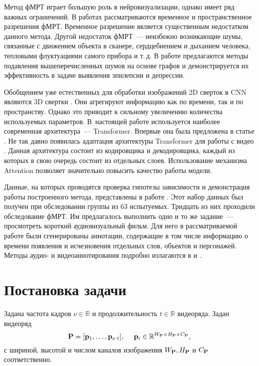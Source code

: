\documentclass[a4paper, 12pt]{article}
\begin{document}
	Метод фМРТ играет большую роль в нейровизуализации, однако имеет ряд важных ограничений.
	В работах \citep{menon1999spatial, logothetis2008we} рассматриваются 
	временное и пространственное разрешения фМРТ. Временное разрешение является существенным
	недостатком данного метода. Другой недостаток фМРТ~--- неизбежно возникающие шумы, 
	связанные с движением объекта в сканере, сердцебиением и дыханием человека, тепловыми
	флуктуациями самого прибора и т.\,д. В работе \citep{1804.10167} предлагаются методы 
	подавления вышеперечисленных шумов на основе графов и демонстрируется их эффективность в задаче
	выявления эпилепсии и депрессии.

	Обобщением уже естественных для обработки изображений 2D сверток в CNN являются 3D
	свертки \citep{Tran_2015_ICCV}.
	Они агрегируют информацию как по времени, так и по пространству.
	Однако это приводит к сильному увеличению количества используемых параметров.
	В~настоящей работе используется наиболее современная архитектура~--- Transformer.
	Впервые она была предложена в статье \citep{https://doi.org/10.48550/arxiv.1706.03762}.
	Не так давно появилась адаптация архитектуры Transformer для работы с видео
	\citep{https://doi.org/10.48550/arxiv.2201.04288}. Данная архитектура состоит из кодировщика
	и декодировщика, каждый из которых в свою очередь состоит из отдельных слоев. Использование 
	механизма Attention \citep{https://doi.org/10.48550/arxiv.1706.03762} 
	позволяет значительно повысить качество работы модели.

	Данные, на которых проводятся проверка гипотезы зависимости и демонстрация работы построенного 
	метода, представлены в работе \citep{Berezutskaya2022}. Этот набор данных был получен при
	обследовании группы из 63 испытуемых. Тридцать из них проходили обследование фМРТ.
	Им предлагалось выполнить одно и то же задание~--- просмотреть короткий аудиовизуальный фильм. 
	Для него в рассматриваемой работе были сгенерированы аннотации, содержащие в том числе информацию о времени появления и исчезновения
	отдельных слов, объектов и персонажей. Методы аудио- и видеоаннотирования подробно излагаются в
	\citep{boersma2018praat} и \citep{Berezutskaya2020}. 

\section{Постановка задачи}

	Задана частота кадров $\nu \in \mathbb{R}$ и продолжительность $t \in \mathbb{R}$ видеоряда. 
	Задан видеоряд
	\begin{equation}
		\label{eq1}
		\mathbf{P} = [\mathbf{p}_1, \ldots, \mathbf{p}_{\nu \cdot t}], \quad\
		\mathbf{p}_i \in \mathbb{R}^{W_{\mathbf{P}} \times H_{\mathbf{P}} \times C_{\mathbf{P}}},
	\end{equation}
	с шириной, высотой и числом каналов изображения $W_{\mathbf{P}}, H_{\mathbf{P}}$ и 
	$C_{\mathbf{P}}$ соответственно.
\end{document}

